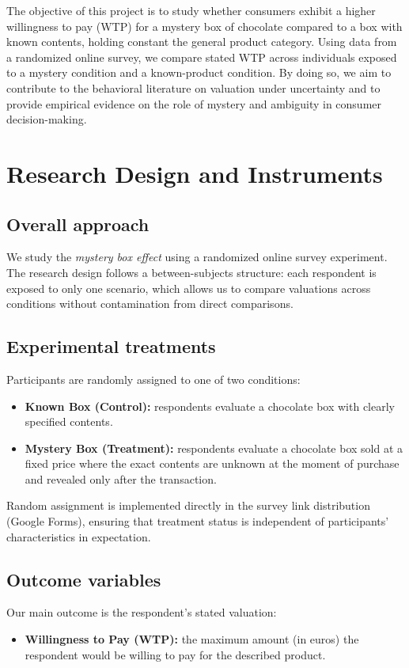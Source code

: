 \documentclass{article}
\begin{document}
The objective of this project is to study whether consumers exhibit a higher willingness to pay (WTP) for a mystery box of chocolate compared to a box with known contents, holding constant the general product category. Using data from a randomized online survey, we compare stated WTP across individuals exposed to a mystery condition and a known-product condition. By doing so, we aim to contribute to the behavioral literature on valuation under uncertainty and to provide empirical evidence on the role of mystery and ambiguity in consumer decision-making.

\section{Research Design and Instruments}
\subsection{Overall approach}
We study the \emph{mystery box effect} using a randomized online survey experiment. The research design follows a between-subjects structure: each respondent is exposed to only one scenario, which allows us to compare valuations across conditions without contamination from direct comparisons.

\subsection{Experimental treatments}
Participants are randomly assigned to one of two conditions:

\begin{itemize}
    \item \textbf{Known Box (Control):} respondents evaluate a chocolate box with clearly specified contents.
    \item \textbf{Mystery Box (Treatment):} respondents evaluate a chocolate box sold at a fixed price where the exact contents are unknown at the moment of purchase and revealed only after the transaction.
\end{itemize}

Random assignment is implemented directly in the survey link distribution (Google Forms), ensuring that treatment status is independent of participants' characteristics in expectation.

\subsection{Outcome variables}
Our main outcome is the respondent's stated valuation:
\begin{itemize}
    \item \textbf{Willingness to Pay (WTP):} the maximum amount (in euros) the respondent would be willing to pay for the described product.
\end{itemize}
\end{document}
